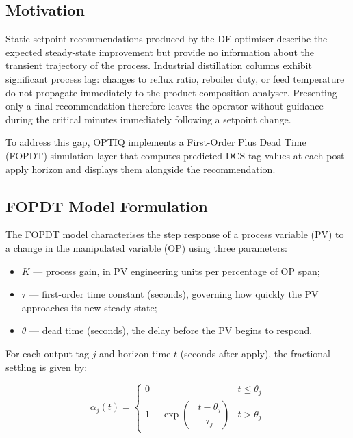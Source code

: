 \subsection{Motivation}

Static setpoint recommendations produced by the DE optimiser describe the
expected steady-state improvement but provide no information about the
transient trajectory of the process.  Industrial distillation columns exhibit
significant process lag: changes to reflux ratio, reboiler duty, or feed
temperature do not propagate immediately to the product composition
analyser.  Presenting only a final recommendation therefore leaves the
operator without guidance during the critical minutes immediately following
a setpoint change.

To address this gap, OPTIQ implements a First-Order Plus Dead Time (FOPDT)
simulation layer that computes predicted DCS tag values at each post-apply
horizon and displays them alongside the recommendation.

\subsection{FOPDT Model Formulation}

The FOPDT model characterises the step response of a process variable (PV)
to a change in the manipulated variable (OP) using three parameters:

\begin{itemize}
  \item $K$ — process gain, in PV engineering units per percentage of OP span;
  \item $\tau$ — first-order time constant (seconds), governing how quickly
        the PV approaches its new steady state;
  \item $\theta$ — dead time (seconds), the delay before the PV begins
        to respond.
\end{itemize}

For each output tag $j$ and horizon time $t$ (seconds after apply), the
fractional settling is given by:

\begin{equation}
  \alpha_j(t) =
  \begin{cases}
    0 & t \le \theta_j \\
    1 - \exp\!\left(-\dfrac{t - \theta_j}{\tau_j}\right) & t > \theta_j
  \end{cases}
  \label{eq:fopdt_settling}
\end{equation}

